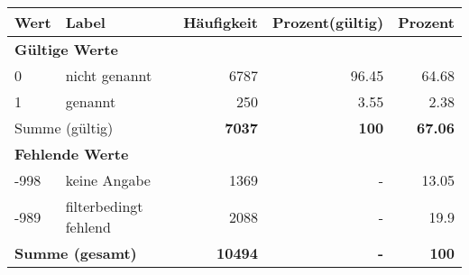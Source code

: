      \begin{longtable}{lXrrr}
     \toprule
     \textbf{Wert} & \textbf{Label} & \textbf{Häufigkeit} & \textbf{Prozent(gültig)} & \textbf{Prozent} \\
     \endhead
     \midrule
     \multicolumn{5}{l}{\textbf{Gültige Werte}}\\

     0 &
     \multicolumn{1}{X}{ nicht genannt   } &


       \num{6787} &
       \num[round-mode=places,round-precision=2]{96,45} &
         \num[round-mode=places,round-precision=2]{64,68} \\

     1 &
     \multicolumn{1}{X}{ genannt   } &


       \num{250} &
       \num[round-mode=places,round-precision=2]{3,55} &
         \num[round-mode=places,round-precision=2]{2,38} \\
     \midrule
     \multicolumn{2}{l}{Summe (gültig)} &
       \textbf{\num{7037}} &
     \textbf{100} &
       \textbf{\num[round-mode=places,round-precision=2]{67,06}} \\
     \multicolumn{5}{l}{\textbf{Fehlende Werte}}\\
       -998 &
       keine Angabe &
         \num{1369} &
        - &
         \num[round-mode=places,round-precision=2]{13,05} \\
       -989 &
       filterbedingt fehlend &
         \num{2088} &
        - &
         \num[round-mode=places,round-precision=2]{19,9} \\
     \midrule
     \multicolumn{2}{l}{\textbf{Summe (gesamt)}} &
          \textbf{\num{10494}} &
        \textbf{-} &
        \textbf{100} \\
     \bottomrule
     \end{longtable}
     
